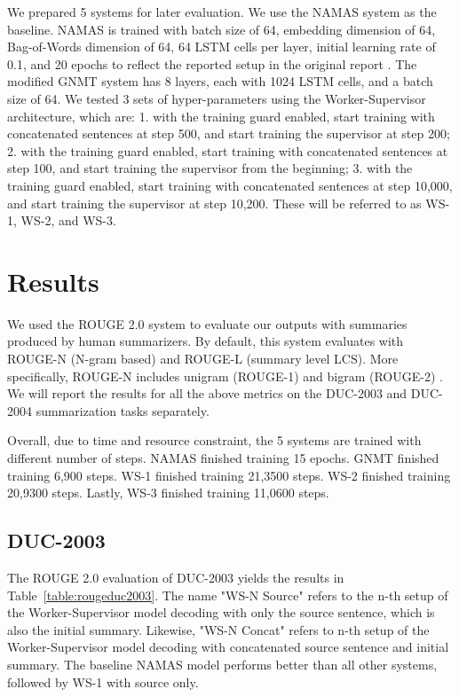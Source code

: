 \documentclass[letterpaper]{article} %
\begin{document}
We prepared 5 systems for later evaluation. We use the NAMAS system as the baseline. NAMAS is trained with batch size of 64, embedding dimension of 64, Bag-of-Words dimension of 64, 64 LSTM cells per layer, initial learning rate of 0.1, and 20 epochs to reflect the reported setup in the original report \cite{rush2015neural}. The modified GNMT system has 8 layers, each with 1024 LSTM cells, and a batch size of 64. We tested 3 sets of hyper-parameters using the Worker-Supervisor architecture, which are: 1. with the training guard enabled, start training with concatenated sentences at step 500, and start training the supervisor at step 200; 2. with the training guard enabled, start training with concatenated sentences at step 100, and start training the supervisor from the beginning; 3. with the training guard enabled, start training with concatenated sentences at step 10,000, and start training the supervisor at step 10,200. These will be referred to as WS-1, WS-2, and WS-3.

\section{Results}
We used the ROUGE 2.0 system \cite{ganesan2015rouge} to evaluate our outputs with summaries produced by human summarizers. By default, this system evaluates with ROUGE-N (N-gram based) and ROUGE-L (summary level LCS). More specifically, ROUGE-N includes unigram (ROUGE-1) and bigram (ROUGE-2) . We will report the results for all the above metrics on the DUC-2003 and DUC-2004 summarization tasks separately.

Overall, due to time and resource constraint, the 5 systems are trained with different number of steps. NAMAS finished training 15 epochs. GNMT finished training 6,900 steps. WS-1 finished training 21,3500 steps. WS-2 finished training 20,9300 steps. Lastly, WS-3 finished training 11,0600 steps.

\subsection{DUC-2003}
The ROUGE 2.0 evaluation of DUC-2003 yields the results in Table~\ref{table:rougeduc2003}. The name "WS-N Source" refers to the n-th setup of the Worker-Supervisor model decoding with only the source sentence, which is also the initial summary. Likewise, "WS-N Concat" refers to n-th setup of the Worker-Supervisor model decoding with concatenated source sentence and initial summary. The baseline NAMAS model performs better than all other systems, followed by WS-1 with source only.
\end{document}
